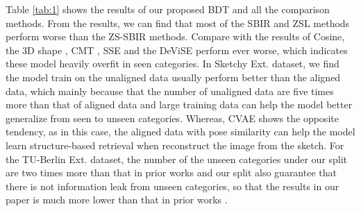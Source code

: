 \documentclass[10pt,twocolumn,letterpaper]{article}
\begin{document}
Table \ref{tab:1} shows the results of our proposed BDT and all the comparison methods. 
From the results, we can find that most of the SBIR and ZSL methods perform worse than the ZS-SBIR methods. 
Compare with the results of Cosine, the 3D shape \cite{wang2015sketch}, CMT \cite{socher2013zero}, SSE \cite{zhang2015bit} and the DeViSE \cite{frome2013devise} perform ever worse, which indicates these model heavily overfit in seen categories. 
In Sketchy Ext. dataset, we find the model train on the unaligned data usually perform better than the aligned data, which mainly because that the number of unaligned data are five times more than that of aligned data and large training data can help the model better generalize from seen to unseen categories. 
Whereas, CVAE shows the opposite tendency, as in this case, the aligned data with pose similarity can help the model learn structure-based retrieval when reconstruct the image from the sketch. 
For the TU-Berlin Ext. dataset, the number of the unseen categories under our split are two times more than that in prior works \cite{liu2019semantic, dutta2019semantically} and our split also guarantee that there is not information leak from unseen categories, so that the results in our paper is much more lower than that in prior works \cite{liu2019semantic, dutta2019semantically}.

\begin{table}[]
\caption{Ablation Study on Sketchy Ext. moved $\mathcal{L}_{or}$ means that we move the orthogonality loss from ($f_{im}^{ap},f_{im}^{st}$) to ($z_{im}^{ap},f_{im}^{st}$); sk2im means we directly translate the image from the sketch structure feature and ignore the variational estimator.}
\label{tab:2}
\end{table}
\end{document}
